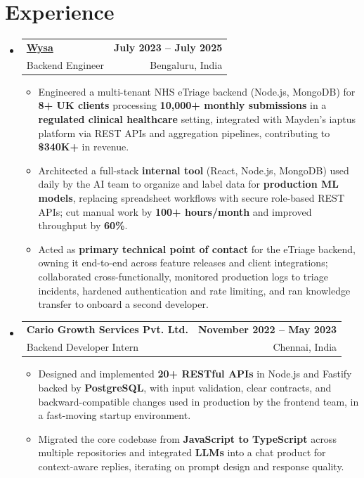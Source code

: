 \documentclass[letterpaper,10pt]{article}
\makeatletter
\newcommand{\resumeItem}[1]{
  \item\small{#1\vspace{-1pt}}
}
\newcommand{\resumeSubheading}[4]{
  \vspace{1pt}\item
    \begin{tabular*}{0.985\textwidth}[t]{l@{\extracolsep{\fill}}r}
      \textbf{#1} & \textbf{\small #2} \\
      {\small\color{ResumeSlate} #3} & {\small\color{ResumeSlate} #4} \\
    \end{tabular*}\vspace{-6pt}
}
\newcommand{\resumeSubHeadingListStart}{\begin{itemize}[leftmargin=0.0in, label={}, itemsep=2pt, topsep=2pt]}
\newcommand{\resumeSubHeadingListEnd}{\end{itemize}}
\newcommand{\resumeItemListStart}{\begin{itemize}[leftmargin=0.18in, itemsep=2pt, topsep=1pt]}
\newcommand{\resumeItemListEnd}{\end{itemize}\vspace{-4pt}}
\makeatother
\begin{document}
\section{Experience}
\resumeSubHeadingListStart
  \resumeSubheading
    {\href{https://www.wysa.io}{Wysa}}{July 2023 -- July 2025}
    {Backend Engineer}{Bengaluru, India}
    \resumeItemListStart
      \resumeItem{Engineered a multi-tenant NHS eTriage backend (Node.js, MongoDB) for \textbf{8+ UK clients} processing \textbf{10{,}000+ monthly submissions} in a \textbf{regulated clinical healthcare} setting, integrated with Mayden's iaptus platform via REST APIs and aggregation pipelines, contributing to \textbf{\$340K+} in revenue.}
      \resumeItem{Architected a full-stack \textbf{internal tool} (React, Node.js, MongoDB) used daily by the AI team to organize and label data for \textbf{production ML models}, replacing spreadsheet workflows with secure role-based REST APIs; cut manual work by \textbf{100+ hours/month} and improved throughput by \textbf{60\%}.}
      \resumeItem{Acted as \textbf{primary technical point of contact} for the eTriage backend, owning it end-to-end across feature releases and client integrations; collaborated cross-functionally, monitored production logs to triage incidents, hardened authentication and rate limiting, and ran knowledge transfer to onboard a second developer.}
    \resumeItemListEnd
  \resumeSubheading
    {Cario Growth Services Pvt. Ltd.}{November 2022 -- May 2023}
    {Backend Developer Intern}{Chennai, India}
    \resumeItemListStart
      \resumeItem{Designed and implemented \textbf{20+ RESTful APIs} in Node.js and Fastify backed by \textbf{PostgreSQL}, with input validation, clear contracts, and backward-compatible changes used in production by the frontend team, in a fast-moving startup environment.}
      \resumeItem{Migrated the core codebase from \textbf{JavaScript to TypeScript} across multiple repositories and integrated \textbf{LLMs} into a chat product for context-aware replies, iterating on prompt design and response quality.}
    \resumeItemListEnd
\resumeSubHeadingListEnd
\vspace{-4pt}
\end{document}

